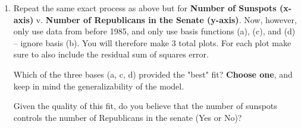 \documentclass[submit]{harvardml}
\begin{document}
\begin{problem}
\begin{enumerate}
First, plot the data and regression lines for each of the following sets of basis functions, and include
the generated plot as an image in your submission PDF. You will therefore make 4 total plots:
\begin{enumerate}
	\item[(a)] $\phi_j(x) = x^j$ for $j=1, \ldots, 5$\\
    ie, use basis $y = a_1 x^1 + a_2 x^2 + a_3 x^3 + a_4 x^4 + a_5 x^5$ for some constants $\{a_1, ..., a_5\}$. 
    \item[(b)] $\phi_j(x) = \exp{\frac{-(x-\mu_j)^2}{25}}$ for $\mu_j=1960, 1965, 1970, 1975, \ldots 2010$
	\item[(c)] $\phi_j(x) = \cos(x / j)$ for $j=1, \ldots, 5$
	\item[(d)] $\phi_j(x) = \cos(x / j)$ for $j=1, \ldots, 25$
\end{enumerate}
\vspace{-2mm}
{\footnotesize * Note: Be sure to add a bias term for each of the basis functions above.}

Second, for each plot include the residual sum of squares error.

\item Repeat the same exact process as above but for \textbf{Number of Sunspots (x-axis)} v. \textbf{Number of Republicans in the Senate (y-axis)}. Now, however, only use data from before 1985, and only use basis functions (a), (c), and (d) -- ignore basis (b). You will therefore make 3 total plots. For each plot make sure to also include the residual sum of squares error.

Which of the three bases (a, c, d) provided the "best" fit? \textbf{Choose one}, and keep in mind the generalizability of the model. 

Given the quality of this fit, do you believe that the number of sunspots controls the number of Republicans in the senate (Yes or No)?

\end{enumerate}

\end{problem}
\end{document}

